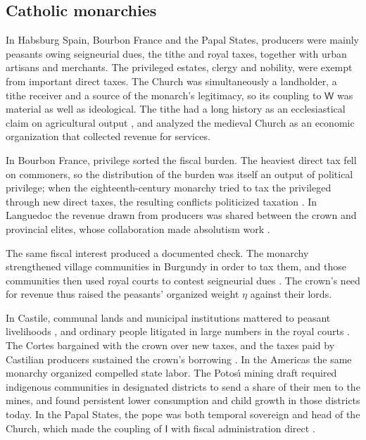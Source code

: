 \documentclass[11pt,letterpaper]{article}
\theoremstyle{definition}
\theoremstyle{remark}
\newcommand{\pI}{\mathsf{I}}
\newcommand{\pW}{\mathsf{W}}
\begin{document}
\subsection{Catholic monarchies}

In Habsburg Spain, Bourbon France and the Papal States, producers were mainly peasants owing seigneurial dues, the tithe and royal taxes, together with urban artisans and merchants. The privileged estates, clergy and nobility, were exempt from important direct taxes. The Church was simultaneously a landholder, a tithe receiver and a source of the monarch's legitimacy, so its coupling to $\pW$ was material as well as ideological. The tithe had a long history as an ecclesiastical claim on agricultural output \citep{constable1964}, and \citet{ekelund1996} analyzed the medieval Church as an economic organization that collected revenue for services.

In Bourbon France, privilege sorted the fiscal burden. The heaviest direct tax fell on commoners, so the distribution of the burden was itself an output of political privilege; when the eighteenth-century monarchy tried to tax the privileged through new direct taxes, the resulting conflicts politicized taxation \citep{kwass2000}. In Languedoc the revenue drawn from producers was shared between the crown and provincial elites, whose collaboration made absolutism work \citep{beik1985}.

The same fiscal interest produced a documented check. The monarchy strengthened village communities in Burgundy in order to tax them, and those communities then used royal courts to contest seigneurial dues \citep{root1987}. The crown's need for revenue thus raised the peasants' organized weight $\eta$ against their lords.

In Castile, communal lands and municipal institutions mattered to peasant livelihoods \citep{vassberg1984}, and ordinary people litigated in large numbers in the royal courts \citep{kagan1981}. The Cortes bargained with the crown over new taxes, and the taxes paid by Castilian producers sustained the crown's borrowing \citep{drelichman2014}. In the Americas the same monarchy organized compelled state labor. The Potos\'{\i} mining draft required indigenous communities in designated districts to send a share of their men to the mines, and \citet{dell2010} found persistent lower consumption and child growth in those districts today. In the Papal States, the pope was both temporal sovereign and head of the Church, which made the coupling of $\pI$ with fiscal administration direct \citep{prodi1987}.
\end{document}
